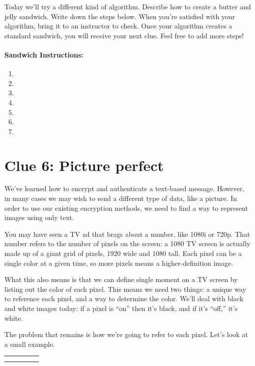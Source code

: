 \documentclass{article}
\begin{document}
Today we'll try a different kind of algorithm. Describe how to create a butter and jelly sandwich. Write down the steps below. When you're satisfied with your algorithm, bring it to an instructor to check. Once your algorithm creates a standard sandwich, you will receive your next clue. Feel free to add more steps!

\paragraph{Sandwich Instructions:}
\begin{enumerate}
  \item
  \item
  \item
  \item
  \item
  \item
  \item
\end{enumerate}

\newpage

\section*{Clue 6: Picture perfect}
We've learned how to encrypt and authenticate a text-based message. However, in many cases we may wish to send a different type of data, like a picture. In order to use our existing encryption methods, we need to find a way to represent images using only text.

You may have seen a TV ad that brags about a number, like 1080i or 720p. That number refers to the number of pixels on the screen: a 1080 TV screen is actually made up of a giant grid of pixels, 1920 wide and 1080 tall. Each pixel can be a single color at a given time, so more pixels means a higher-definition image.

What this also means is that we can define single moment on a TV screen by listing out the color of each pixel. This means we need two things: a unique way to reference each pixel, and a way to determine the color. We'll deal with black and white images today: if a pixel is  ``on'' then it's black, and if it's ``off,'' it's white. 

The problem that remains is how we're going to refer to each pixel. Let's look at a small example.

\begin{center}
\begin{tabular}{*{5}{|c}|}
\hline
 &  &  &  &  \\ \hline
 &  &  &  &  \\ \hline
 &  &  &  &  \\ \hline
\end{tabular}
\end{center}
\end{document}
